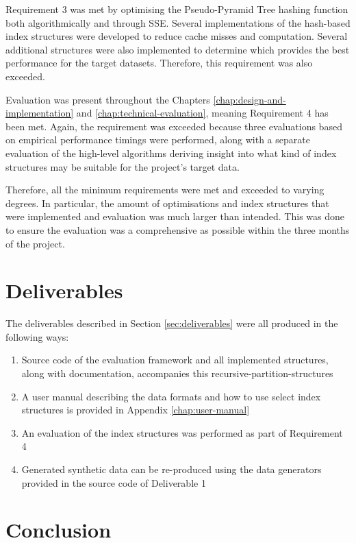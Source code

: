 Requirement 3 was met by optimising the Pseudo-Pyramid Tree hashing function both algorithmically and through SSE. Several implementations of the hash-based index structures were developed to reduce cache misses and computation. Several additional structures were also implemented to determine which provides the best performance for the target datasets. Therefore, this requirement was also exceeded.

Evaluation was present throughout the Chapters \ref{chap:design-and-implementation} and \ref{chap:technical-evaluation}, meaning Requirement 4 has been met. Again, the requirement was exceeded because three evaluations based on empirical performance timings were performed, along with a separate evaluation of the high-level algorithms deriving insight into what kind of index structures may be suitable for the project's target data.

Therefore, all the minimum requirements were met and exceeded to varying degrees. In particular, the amount of optimisations and index structures that were implemented and evaluation was much larger than intended. This was done to ensure the evaluation was a comprehensive as possible within the three months of the project.

\section{Deliverables}

The deliverables described in Section \ref{sec:deliverables} were all produced in the following ways:
\begin{enumerate}
	\item Source code of the evaluation framework and all implemented structures, along with documentation, accompanies this recursive-partition-structures
	\item A user manual describing the data formats and how to use select index structures is provided in Appendix \ref{chap:user-manual}
	\item An evaluation of the index structures was performed as part of Requirement 4
	\item Generated synthetic data can be re-produced using the data generators provided in the source code of Deliverable 1
\end{enumerate}

\section{Conclusion}


